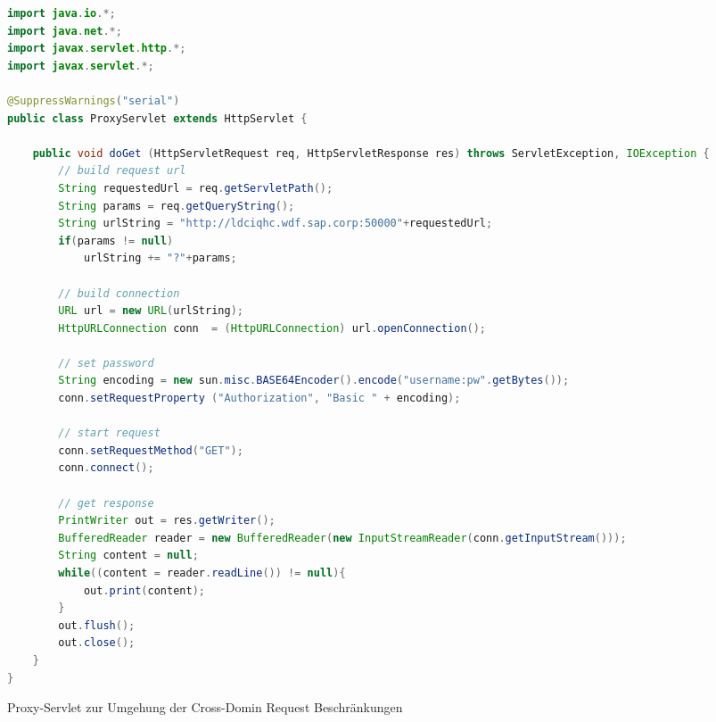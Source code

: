 \begin{programm}[h] %
\begin{lstlisting}[language=Java]
import java.io.*;
import java.net.*;
import javax.servlet.http.*;
import javax.servlet.*;

@SuppressWarnings("serial")
public class ProxyServlet extends HttpServlet {

	public void doGet (HttpServletRequest req, HttpServletResponse res) throws ServletException, IOException {
		// build request url
		String requestedUrl = req.getServletPath();
		String params = req.getQueryString();
		String urlString = "http://ldciqhc.wdf.sap.corp:50000"+requestedUrl;
		if(params != null)
			urlString += "?"+params;
		
		// build connection
		URL url = new URL(urlString);
		HttpURLConnection conn  = (HttpURLConnection) url.openConnection();
		
		// set password
		String encoding = new sun.misc.BASE64Encoder().encode("username:pw".getBytes());
		conn.setRequestProperty ("Authorization", "Basic " + encoding);
		
		// start request
		conn.setRequestMethod("GET");
		conn.connect();
		
		// get response
		PrintWriter out = res.getWriter();
		BufferedReader reader = new BufferedReader(new InputStreamReader(conn.getInputStream()));
		String content = null;
		while((content = reader.readLine()) != null){
			out.print(content);
		}
		out.flush();
		out.close();
	}
}
\end{lstlisting}
\caption{Proxy-Servlet zur Umgehung der Cross-Domin Request Beschränkungen\label{listing:servlet}}
\end{programm}

\newpage
\sePrintGlossary{}

\sePrintBibliography{}





\seEhrenwoertlicheErklaerung{}



